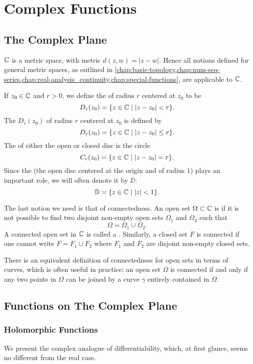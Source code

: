 \chapter{Complex Functions}\label{chap:complex-functions}
\section{The Complex Plane}
$\mathbb C$ is a metric space, with metric $d(z,w)=|z-w|$. Hence all notions defined for general metric spaces, as outlined in \cref{chap:basic-topology,chap:num-seq-series,chap:real-analysis_continuity,chap:special-functions}, are applicable to $\mathbb C$.

If $z_0\in\mathbb C$ and $r>0$, we define the  of radius $r$ centered at $z_0$ to be
\[D_r(z_0)=\{z\in\mathbb C\mid |z-z_0|<r\}.\]
The  $D_r(z_0)$ of radius $r$ centered at $z_0$ is defined by
\[D_r(z_0)=\{z\in\mathbb C\mid |z-z_0|\le r\}.\]
The  of either the open or closed disc is the circle
\[C_r(z_0)=\{z\in\mathbb C\mid |z-z_0|=r\}.\]
Since the  (the open disc centered at the origin and of radius $1$) plays an important role, we will often denote it by $\DD$:
\[\mathbb D=\{z\in\mathbb C\mid |z|<1\}.\]

The last notion we need is that of connectedness. An open set $\Omega\subset\mathbb C$ is  if it is not possible to find two disjoint non-empty open sets $\Omega_1$ and $\Omega_2$ such that 
\[\Omega=\Omega_1\cup\Omega_2.\]
A connected open set in $\mathbb C$ is called a . Similarly, a closed set $F$ is connected if one cannot write $F=F_1\cup F_2$ where $F_1$ and $F_2$ are disjoint non-empty closed sets.

There is an equivalent definition of connectedness for open sets in terms of curves, which is often useful in practice: an open set $\Omega$ is connected if and only if any two points in $\Omega$ can be joined by a curve $\gamma$ entirely contained in $\Omega$.
\pagebreak

\section{Functions on The Complex Plane}
\subsection{Holomorphic Functions}
We present the complex analogue of differentiability, which, at first glance, seems no different from the real case.

